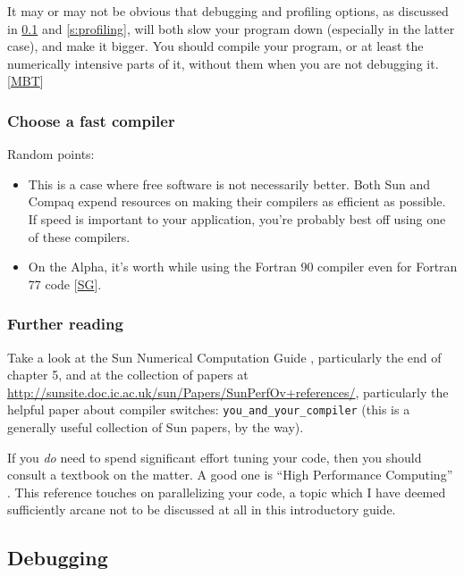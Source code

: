 \documentclass[11pt,oneside,chapters]{starlink}
\begin{document}
It may or may not be obvious that debugging and
profiling options, as discussed in \ref{s:debugging} and \ref{s:profiling},
will both slow your program down (especially in the latter
case), and make it bigger.  You should compile your
program, or at least the numerically intensive parts of
it, without them when you are not debugging it. 
[\hyperlink{ta:mbt}{MBT}]


\subsubsection{Choose a fast compiler}

Random points:

\begin{itemize}
\item
This is a case where free software is not
necessarily better.  Both Sun and Compaq expend
resources on making their compilers as efficient
as possible.  If speed is important to your
application, you're probably best off using one of
these compilers.

\item
On the Alpha, it's worth while using the
Fortran 90 compiler even for Fortran 77 code
[\hyperlink{ta:sg}{SG}].
\end{itemize}

\subsubsection{Further reading}
\label{s:ncbooks}

Take a look at the Sun Numerical Computation Guide
\citep{sunncg}, particularly the end of
chapter 5, and at the collection of papers at
\url{http://sunsite.doc.ic.ac.uk/sun/Papers/SunPerfOv+references/},
particularly the helpful paper about compiler switches:
\texttt{you\_and\_your\_compiler} (this is a generally
useful collection of Sun papers, by the way).

If you \emph{do} need to spend significant effort
tuning your code, then you should consult a textbook on
the matter.  A good one is
``High Performance Computing'' \citep{dowd}.  This
reference touches on parallelizing your code, a topic
which I have deemed sufficiently arcane not to be
discussed at all in this introductory guide.

\subsection{Debugging}
\label{s:debugging}
\end{document}
